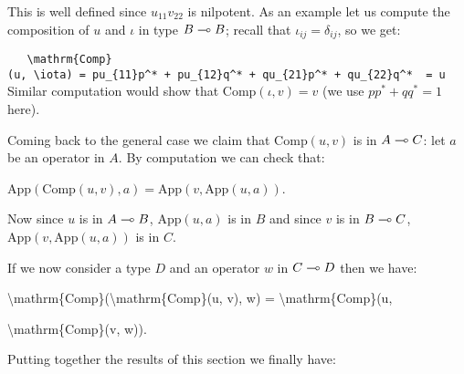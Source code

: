 This is well defined since \(u_{11}v_{22}\) is nilpotent. As an example
let us compute the composition of \(u\) and \(\iota\) in type
\(B\multimap B\); recall that \(\iota_{ij} = \delta_{ij}\), so we get:

\begin{description}
\tightlist
\item[]
\end{description}

\texttt{~~~\textbackslash{}mathrm\{Comp\}(u,~\textbackslash{}iota)~=~pu\_\{11\}p\^{}*~+~pu\_\{12\}q\^{}*~+~qu\_\{21\}p\^{}*~+~qu\_\{22\}q\^{}*~~=~u}\\

Similar computation would show that \(\mathrm{Comp}(\iota, v) = v\) (we
use \(pp^* + qq^* = 1\) here).

Coming back to the general case we claim that \(\mathrm{Comp}(u, v)\) is
in \(A\multimap C\): let \(a\) be an operator in \(A\). By computation we
can check that:

\begin{description}
\tightlist
\item[]
\(\mathrm{App}(\mathrm{Comp}(u, v), a) = \mathrm{App}(v, \mathrm{App}(u, a))\).
\end{description}

Now since \(u\) is in \(A\multimap B\), \(\mathrm{App}(u, a)\) is in \(B\)
and since \(v\) is in \(B\multimap C\),
\(\mathrm{App}(v, \mathrm{App}(u, a))\) is in \(C\).

If we now consider a type \(D\) and an operator \(w\) in \(C\multimap D\)
then we have:

\begin{description}
\tightlist
\item[]
\textbackslash{}mathrm\{Comp\}(\textbackslash{}mathrm\{Comp\}(u, v), w)
= \textbackslash{}mathrm\{Comp\}(u,
\end{description}

\textbackslash{}mathrm\{Comp\}(v, w)).

Putting together the results of this section we finally have:

